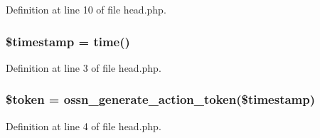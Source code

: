 Definition at line 10 of file head.\+php.

\subsubsection[{\texorpdfstring{\$timestamp}{$timestamp}}]{\setlength{\rightskip}{0pt plus 5cm}\$timestamp = time()}\hypertarget{head_8php_a2b69de9676dd97c675cd4d9bcceb684c}{}\label{head_8php_a2b69de9676dd97c675cd4d9bcceb684c}


Definition at line 3 of file head.\+php.

\subsubsection[{\texorpdfstring{\$token}{$token}}]{\setlength{\rightskip}{0pt plus 5cm}\$token = {\bf ossn\+\_\+generate\+\_\+action\+\_\+token}(\$timestamp)}\hypertarget{head_8php_a00ae4fcafb1145f5e968bdf920f83e2e}{}\label{head_8php_a00ae4fcafb1145f5e968bdf920f83e2e}


Definition at line 4 of file head.\+php.

